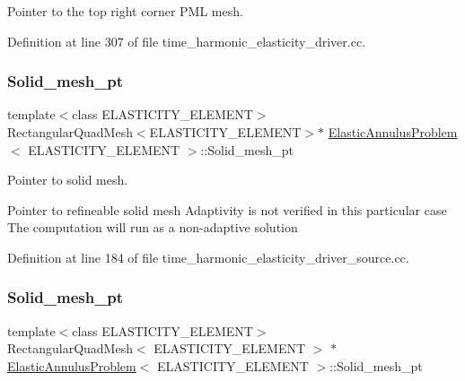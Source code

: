 Pointer to the top right corner P\+ML mesh. 



Definition at line 307 of file time\+\_\+harmonic\+\_\+elasticity\+\_\+driver.\+cc.

\mbox{\label{classElasticAnnulusProblem_af0c334a5413eac6077177769b2a5f1f8}} 
\subsubsection{\texorpdfstring{Solid\+\_\+mesh\+\_\+pt}{Solid\_mesh\_pt}\hspace{0.1cm}{\footnotesize\ttfamily [1/3]}}
{\footnotesize\ttfamily template$<$class E\+L\+A\+S\+T\+I\+C\+I\+T\+Y\+\_\+\+E\+L\+E\+M\+E\+NT$>$ \\
Rectangular\+Quad\+Mesh$<$E\+L\+A\+S\+T\+I\+C\+I\+T\+Y\+\_\+\+E\+L\+E\+M\+E\+NT$>$$\ast$ \hyperlink{classElasticAnnulusProblem}{Elastic\+Annulus\+Problem}$<$ E\+L\+A\+S\+T\+I\+C\+I\+T\+Y\+\_\+\+E\+L\+E\+M\+E\+NT $>$\+::Solid\+\_\+mesh\+\_\+pt\hspace{0.3cm}{\ttfamily [private]}}



Pointer to solid mesh. 

Pointer to refineable solid mesh Adaptivity is not verified in this particular case The computation will run as a non-\/adaptive solution 

Definition at line 184 of file time\+\_\+harmonic\+\_\+elasticity\+\_\+driver\+\_\+source.\+cc.

\mbox{\label{classElasticAnnulusProblem_a1e751b41cfaf6314fd93d8b79fbd6d0b}} 
\subsubsection{\texorpdfstring{Solid\+\_\+mesh\+\_\+pt}{Solid\_mesh\_pt}\hspace{0.1cm}{\footnotesize\ttfamily [2/3]}}
{\footnotesize\ttfamily template$<$class E\+L\+A\+S\+T\+I\+C\+I\+T\+Y\+\_\+\+E\+L\+E\+M\+E\+NT$>$ \\
Rectangular\+Quad\+Mesh$<$ E\+L\+A\+S\+T\+I\+C\+I\+T\+Y\+\_\+\+E\+L\+E\+M\+E\+NT $>$ $\ast$ \hyperlink{classElasticAnnulusProblem}{Elastic\+Annulus\+Problem}$<$ E\+L\+A\+S\+T\+I\+C\+I\+T\+Y\+\_\+\+E\+L\+E\+M\+E\+NT $>$\+::Solid\+\_\+mesh\+\_\+pt\hspace{0.3cm}{\ttfamily [private]}}



